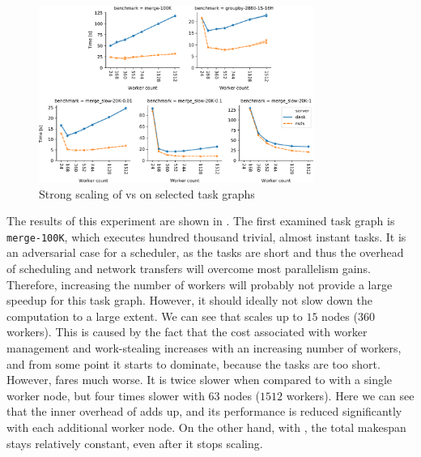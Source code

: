 \begin{figure}[h]
	\centering
	\includegraphics[width=0.8\textwidth]{./imgs/rsds/charts/rsds-dask-scaling}
	\caption{Strong scaling of \rsds{} vs \dask{} on selected task graphs}
	\label{fig:rsds-dask-scaling}
\end{figure}

The results of this experiment are shown in . The first examined task
graph is \texttt{merge-100K}, which executes hundred thousand trivial, almost instant
tasks. It is an adversarial case for a scheduler, as the tasks are short and thus the overhead of
scheduling and network transfers will overcome most parallelism gains. Therefore, increasing the
number of workers will probably not provide a large speedup for this task graph. However, it should
ideally not slow down the computation to a large extent. We can see that
\rsds{} scales up to $15$ nodes
($360$ workers). This is caused by the fact that the cost associated with
worker management and work-stealing increases with an increasing number of workers, and from some
point it starts to dominate, because the tasks are too short. However, \dask{}
fares much worse. It is twice slower when compared to \rsds{} with a single
worker node, but four times slower with $63$ nodes
($1512$ workers). Here we can see that the inner overhead of
\dask{} adds up, and its performance is reduced significantly with each
additional worker node. On the other hand, with \rsds{}, the total makespan
stays relatively constant, even after it stops scaling.

